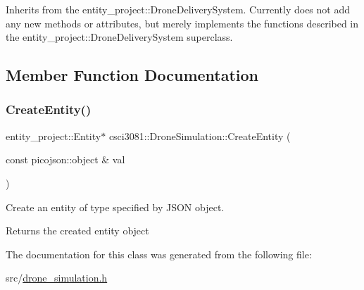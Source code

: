 Inherits from the entity\+\_\+project\+::\+Drone\+Delivery\+System. Currently does not add any new methods or attributes, but merely implements the functions described in the entity\+\_\+project\+::\+Drone\+Delivery\+System superclass. 

\subsection{Member Function Documentation}
\mbox{\label{classcsci3081_1_1DroneSimulation_af969b43abab98c458a50cad9f99a0440}} 
\subsubsection{\texorpdfstring{Create\+Entity()}{CreateEntity()}}
{\footnotesize\ttfamily entity\+\_\+project\+::\+Entity$\ast$ csci3081\+::\+Drone\+Simulation\+::\+Create\+Entity (\begin{DoxyParamCaption}\item[{const picojson\+::object \&}]{val }\end{DoxyParamCaption})\hspace{0.3cm}{\ttfamily [inline]}}



Create an entity of type specified by J\+S\+ON object. 

\begin{DoxyReturn}{Returns}
the created entity object 
\end{DoxyReturn}


The documentation for this class was generated from the following file\+:\begin{DoxyCompactItemize}
\item 
src/\hyperlink{drone__simulation_8h}{drone\+\_\+simulation.\+h}\end{DoxyCompactItemize}
